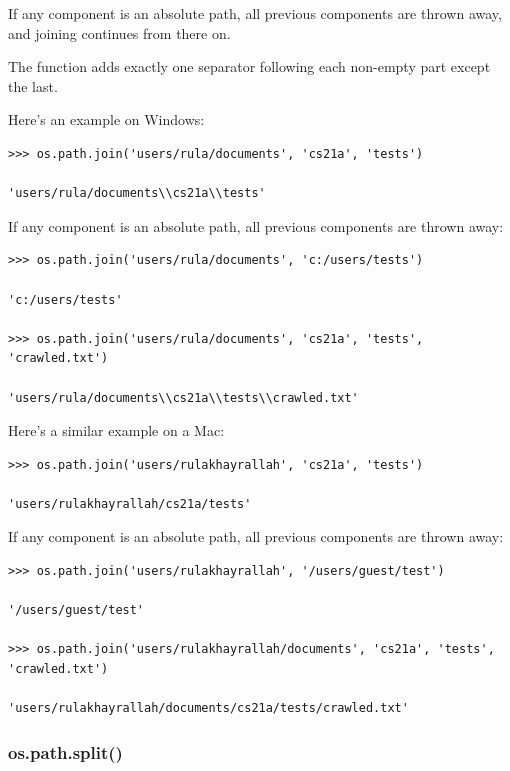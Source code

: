 \documentclass{article}
\begin{document}
If any component is an absolute path, all previous components are thrown away, and joining continues from there on.

The function adds exactly one separator following each non-empty part except the last. 

Here's an example on Windows:

\begin{lstlisting}
>>> os.path.join('users/rula/documents', 'cs21a', 'tests')

'users/rula/documents\\cs21a\\tests'
\end{lstlisting}

If any component is an absolute path, all previous components are thrown away:

\begin{lstlisting}
>>> os.path.join('users/rula/documents', 'c:/users/tests')

'c:/users/tests'

>>> os.path.join('users/rula/documents', 'cs21a', 'tests', 'crawled.txt')

'users/rula/documents\\cs21a\\tests\\crawled.txt'
\end{lstlisting}

Here's a similar example on a Mac:

\begin{lstlisting}
>>> os.path.join('users/rulakhayrallah', 'cs21a', 'tests')

'users/rulakhayrallah/cs21a/tests'
\end{lstlisting}

If any component is an absolute path, all previous components are thrown away:

\begin{lstlisting}
>>> os.path.join('users/rulakhayrallah', '/users/guest/test')

'/users/guest/test'

>>> os.path.join('users/rulakhayrallah/documents', 'cs21a', 'tests', 'crawled.txt')

'users/rulakhayrallah/documents/cs21a/tests/crawled.txt'
\end{lstlisting}

\subsubsection{os.path.split()}
\end{document}
